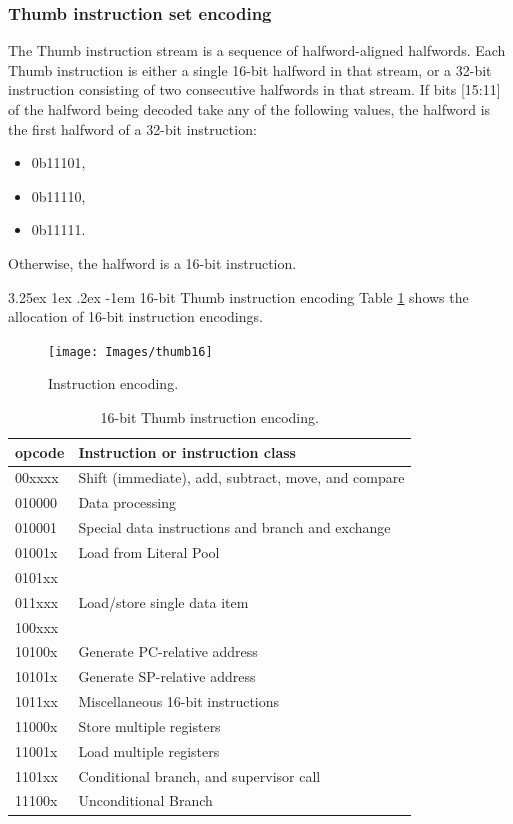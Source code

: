 \documentclass[11pt]{report}
\makeatletter
\renewcommand\paragraph{\@startsection{paragraph}{5}{\z@}%
	{3.25ex \@plus1ex \@minus.2ex}%
	{-1em}%
	{\normalfont\normalsize\bfseries}}
\makeatother
\begin{document}
			\subsubsection{Thumb instruction set encoding}
			\par The Thumb instruction stream is a sequence of halfword-aligned halfwords. Each Thumb instruction is either a single 16-bit halfword in that stream, or a 32-bit instruction consisting of two consecutive halfwords	in that stream.
			If bits [15:11] of the halfword being decoded take any of the following values, the halfword is the first	halfword of a 32-bit instruction:
			\begin{itemize}
				\item 0b11101,
				\item 0b11110,
				\item 0b11111.
			\end{itemize}
			\par Otherwise, the halfword is a 16-bit instruction.
			
			
			\paragraph{16-bit Thumb instruction encoding} Table \ref{tab:thumb16} shows the allocation of 16-bit instruction encodings.
			
			\begin{figure} [H]
				\centering
				\texttt{[image: Images/thumb16]}
				\caption{Instruction encoding.}
				\label{fig:thumb16}
			\end{figure}
			
			\begin{table}[H]
				\centering
				\caption{16-bit Thumb instruction encoding.}
				\label{tab:thumb16}
				\begin{tabular}{l|l}
					\hline 
					\textbf{opcode} & \textbf{Instruction or instruction class} \\ \hline
					00xxxx & Shift (immediate), add, subtract, move, and compare \\
					010000 & Data processing \\
					010001 & Special data instructions and branch and exchange \\
					01001x & Load from Literal Pool \\
					0101xx & \multirow{3}{*}{Load/store single data item} \\
					011xxx &  \\
					100xxx &  \\
					10100x & Generate PC-relative address \\
					10101x & Generate SP-relative address \\
					1011xx & Miscellaneous 16-bit instructions \\
					11000x & Store multiple registers \\
					11001x & Load multiple registers \\
					1101xx & Conditional branch, and supervisor call \\
					11100x & Unconditional Branch \\
					\hline
				\end{tabular}
			\end{table}
			
\end{document}
